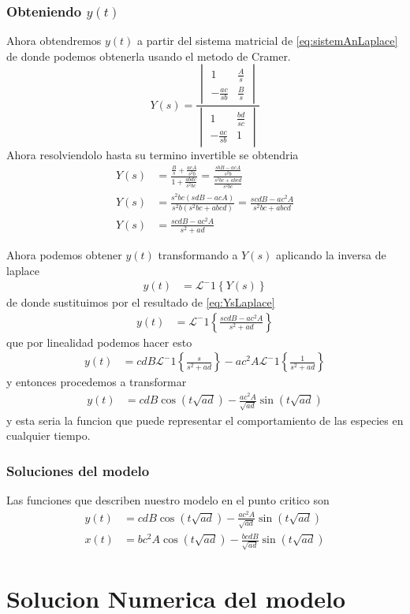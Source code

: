\documentclass{report}
\begin{document}
\subsection{Obteniendo $y(t)$}
Ahora obtendremos $y(t)$ a partir del sistema matricial de \ref{eq:sistemAnLaplace} de donde podemos obtenerla usando el metodo de Cramer.
\begin{equation}
Y(s)=
\frac{
\begin{vmatrix}
1 &\frac{A}{s} \\
-\frac{ac}{sb} &\frac{B}{s}
\end{vmatrix}}{
\begin{vmatrix}
1 &\frac{bd}{sc}\\
-\frac{ac}{sb} &1
\end{vmatrix}}
\end{equation}
Ahora resolviendolo hasta su termino invertible se obtendria
\begin{align}
Y(s)&=\frac{\frac{B}{s}+\frac{acA}{s^2b}}{
1+\frac{abdc}{s^2bc}}
=
\frac{\frac{sbB-acA}{s^2b}}{
\frac{s^2bc+abcd}{s^2bc}}
\nonumber\\Y(s)&=
\frac{s^2bc(sdB-acA)}{s^2b(s^2bc+abcd)}
=
\frac{scdB-ac^2A}{s^2bc+abcd}
\nonumber\\Y(s)&=
\frac{scdB-ac^2A}{s^2+ad} \label{eq:YsLaplace}
\end{align}

Ahora podemos obtener $y(t)$ transformando a $Y(s)$ aplicando la inversa de laplace
\begin{align*}
y(t)&=\mathcal{L}^-1\left\{ Y(s) \right\}
\end{align*}
de donde sustituimos por el resultado de \ref{eq:YsLaplace} 
\begin{align*}
y(t)&=\mathcal{L}^-1\left\{ \frac{scdB-ac^2A}{s^2+ad} \right\}
\end{align*}
que por linealidad podemos hacer esto
\begin{align*}
y(t)&=cdB\mathcal{L}^-1\left\{ \frac{s}{s^2+ad} \right\}
-ac^2A\mathcal{L}^-1\left\{ \frac{1}{s^2+ad} \right\}
\end{align*}
y entonces procedemos a transformar
\begin{align}
y(t)&=cdB\cos(t\sqrt{ad})
-\frac{ac^2A}{\sqrt{ad}}\sin(t\sqrt{ad}) \label{eq:ytAn}
\end{align}
y esta seria la funcion que puede representar el comportamiento de las especies en cualquier tiempo.

\subsection{Soluciones del modelo}

Las funciones que describen nuestro modelo en el punto critico son
\begin{align*}
y(t)&=cdB\cos(t\sqrt{ad})
-\frac{ac^2A}{\sqrt{ad}}\sin(t\sqrt{ad}) \\
x(t)&=bc^2A\cos(t\sqrt{ad})-\frac{bcdB}{\sqrt{ad}}\sin(t\sqrt{ad})
\end{align*}

\chapter{Solucion Numerica del modelo}
\end{document}
